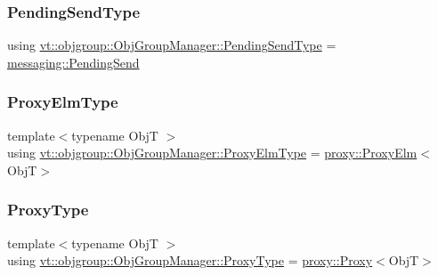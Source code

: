\subsubsection{\texorpdfstring{Pending\+Send\+Type}{PendingSendType}}
{\footnotesize\ttfamily using \hyperlink{structvt_1_1objgroup_1_1_obj_group_manager_a4f82f640edf670ba5a282074e5710921}{vt\+::objgroup\+::\+Obj\+Group\+Manager\+::\+Pending\+Send\+Type} =  \hyperlink{structvt_1_1messaging_1_1_pending_send}{messaging\+::\+Pending\+Send}}

\mbox{\label{structvt_1_1objgroup_1_1_obj_group_manager_adba6c8ecb0f4c30e719f1abb995cfc9b}} 
\subsubsection{\texorpdfstring{Proxy\+Elm\+Type}{ProxyElmType}}
{\footnotesize\ttfamily template$<$typename ObjT $>$ \\
using \hyperlink{structvt_1_1objgroup_1_1_obj_group_manager_adba6c8ecb0f4c30e719f1abb995cfc9b}{vt\+::objgroup\+::\+Obj\+Group\+Manager\+::\+Proxy\+Elm\+Type} =  \hyperlink{structvt_1_1objgroup_1_1proxy_1_1_proxy_elm}{proxy\+::\+Proxy\+Elm}$<$ObjT$>$}

\mbox{\label{structvt_1_1objgroup_1_1_obj_group_manager_aea65eef52f240a52210132eef5ce591f}} 
\subsubsection{\texorpdfstring{Proxy\+Type}{ProxyType}}
{\footnotesize\ttfamily template$<$typename ObjT $>$ \\
using \hyperlink{structvt_1_1objgroup_1_1_obj_group_manager_aea65eef52f240a52210132eef5ce591f}{vt\+::objgroup\+::\+Obj\+Group\+Manager\+::\+Proxy\+Type} =  \hyperlink{structvt_1_1objgroup_1_1proxy_1_1_proxy}{proxy\+::\+Proxy}$<$ObjT$>$}



